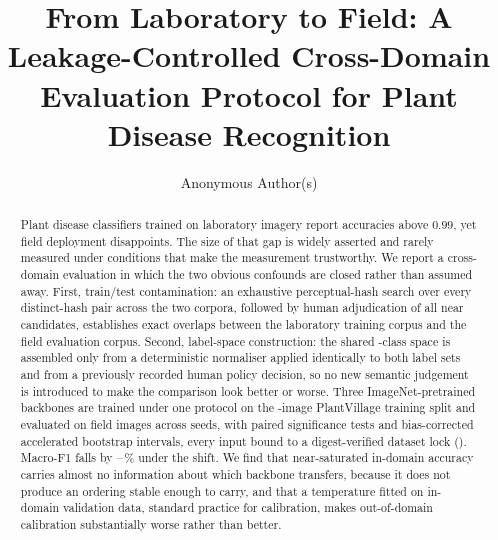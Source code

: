 \documentclass[runningheads]{llncs}
\begin{document}
\title{From Laboratory to Field: A Leakage-Controlled Cross-Domain
Evaluation Protocol for Plant Disease Recognition}

\author{Anonymous Author(s)}

\maketitle

\begin{abstract}
Plant disease classifiers trained on laboratory imagery report accuracies above
$0.99$, yet field deployment disappoints. The size of that gap is widely
asserted and rarely measured under conditions that make the measurement
trustworthy. We report a cross-domain evaluation in which the two obvious
confounds are closed rather than assumed away. First, train/test contamination:
an exhaustive perceptual-hash search over every distinct-hash pair across the
two corpora, followed by human adjudication of all \NLeakNearCore{} near
candidates, establishes \NLeakExactCore{} exact overlaps between the laboratory
training corpus and the field evaluation corpus. Second, label-space
construction: the shared \NSharedClasses{}-class space is assembled only from a
deterministic normaliser applied identically to both label sets and from a
previously recorded human policy decision, so no new semantic judgement is
introduced to make the comparison look better or worse. Three
ImageNet-pretrained backbones are trained under one protocol on the
\NPvTrain{}-image PlantVillage training split and evaluated on \NXdImages{}
field images across \NSeedsDone{} seeds, with paired significance tests and
bias-corrected accelerated bootstrap intervals, every input bound to a
digest-verified dataset lock (\LockDigest{}). Macro-F1 falls by
\RelDropFMeanRn{}--\RelDropFMeanMn{}\,\% under the shift. We find that
near-saturated in-domain accuracy carries almost no information about which
backbone transfers, because it does not produce an ordering stable enough to
carry, and that a temperature fitted on in-domain validation data, standard
practice for calibration, makes out-of-domain calibration substantially worse
rather than better.

\end{abstract}
\end{document}
